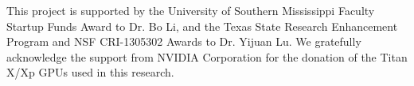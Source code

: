 \documentclass[../main.tex]{subfiles}
\begin{document}
This project is supported by the University of Southern
Mississippi Faculty Startup Funds Award to Dr. Bo Li, and
the Texas State Research Enhancement Program and NSF
CRI-1305302 Awards to Dr. Yijuan Lu. We gratefully acknowledge the support from NVIDIA Corporation for the
donation of the Titan X/Xp GPUs used in this research.
\end{document}
